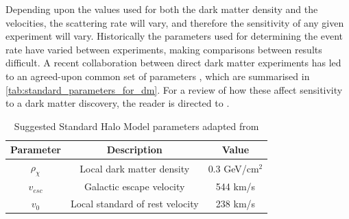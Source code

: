 \par
Depending upon the values used for both the dark matter density and the velocities, the scattering rate will vary, and therefore the sensitivity of any given experiment will vary.
Historically the parameters used for determining the event rate have varied between experiments, making comparisons between results difficult.
A recent collaboration between direct dark matter experiments has led to an agreed-upon common set of parameters \cite{standard_halo_model_conventions_ref}, which are summarised in \autoref{tab:standard_parameters_for_dm}.
For a review of how these affect sensitivity to a dark matter discovery, the reader is directed to \cite{dm_velocity_effects_on_limits_ref}.

\begin{table}[]
    \centering
    \begin{tabular}{c|c|c}
        Parameter                               & Description                       & Value         \\ \hline
        $\rho_{\chi}$                           & Local dark matter density         & 0.3 GeV/cm$^2$ \cite{shm_derivation_ref}           \\
        $v_{esc}$                             & Galactic escape velocity          & 544 km/s  \cite{dm_v_esc_ref}           \\
        $v_0$                             & Local standard of rest velocity   & 238 km/s   \cite{dm_v_0_ref}           
    \end{tabular}
    \caption{Suggested Standard Halo Model parameters adapted from \cite{standard_halo_model_conventions_ref}}
    \label{tab:standard_parameters_for_dm}
\end{table}

